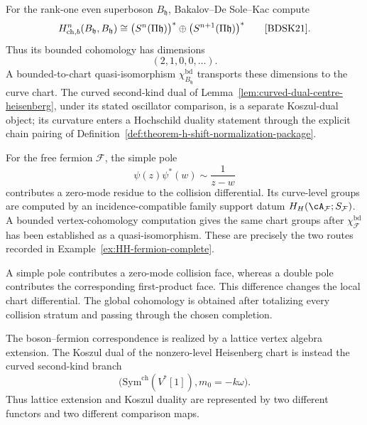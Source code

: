 \begin{computation}
\label{comp:boson-hochschild}
For the rank-one even superboson \(B_{\mathfrak h}\),
Bakalov--De Sole--Kac compute
\[
 H^n_{\mathrm{ch},b}(B_{\mathfrak h},B_{\mathfrak h})
 \cong
 \bigl(S^n(\Pi\mathfrak h)\bigr)^*
 \oplus
 \bigl(S^{n+1}(\Pi\mathfrak h)\bigr)^*
 \qquad\text{\cite[Theorem~7.4]{BDSK21}}.
\]
Thus its bounded cohomology has dimensions
\[
 (2,1,0,0,\ldots).
\]
A bounded-to-chart quasi-isomorphism
\(\chi_{B_{\mathfrak h}}^{\mathrm{bd}}\) transports these dimensions
to the curve chart.  The curved second-kind dual of
Lemma~\ref{lem:curved-dual-centre-heisenberg}, under its stated
oscillator comparison, is a separate Koszul-dual object; its curvature
enters a Hochschild duality statement through
the explicit chain pairing of
Definition~\ref{def:theorem-h-shift-normalization-package}.
\end{computation}

\begin{computation}
\label{comp:fermion-hochschild}
For the free fermion \(\mathcal F\), the simple pole
\[
 \psi(z)\psi^*(w)\sim\frac{1}{z-w}
\]
contributes a zero-mode residue to the collision differential.  Its
curve-level groups are computed by an incidence-compatible family
support datum \(H_H(\cA_{\mathcal F};S_{\mathcal F})\).  A bounded
vertex-cohomology computation gives the same chart groups after
\(\chi_{\mathcal F}^{\mathrm{bd}}\) has been established as a
quasi-isomorphism.  These are precisely the two routes recorded in
Example~\ref{ex:HH-fermion-complete}.
\end{computation}

\begin{remark}
\label{rem:boson-fermion-hochschild-comparison}
A simple pole contributes a zero-mode collision face, whereas a double
pole contributes the corresponding first-product face.  This
difference changes the local chart differential.  The global
cohomology is obtained after totalizing every collision stratum and
passing through the chosen completion.

The boson--fermion correspondence is realized by a lattice vertex
algebra extension.  The Koszul dual of the nonzero-level Heisenberg
chart is instead the curved second-kind branch
\[
 \bigl(\mathrm{Sym}^{\mathrm{ch}}(V^*[1]),m_0=-k\omega\bigr).
\]
Thus lattice extension and Koszul duality are represented by two
different functors and two different comparison maps.
\end{remark}

